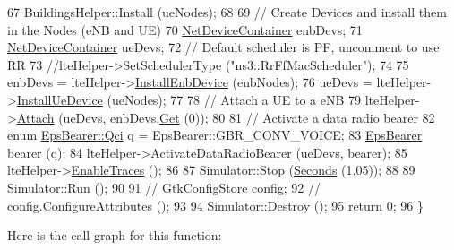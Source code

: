 \begin{DoxyCode}
67   BuildingsHelper::Install (ueNodes);
68 
69   \textcolor{comment}{// Create Devices and install them in the Nodes (eNB and UE)}
70   \hyperlink{classns3_1_1NetDeviceContainer}{NetDeviceContainer} enbDevs;
71   \hyperlink{classns3_1_1NetDeviceContainer}{NetDeviceContainer} ueDevs;
72   \textcolor{comment}{// Default scheduler is PF, uncomment to use RR}
73   \textcolor{comment}{//lteHelper->SetSchedulerType ("ns3::RrFfMacScheduler");}
74 
75   enbDevs = lteHelper->\hyperlink{classns3_1_1LteHelper_a5e009ad35ef85f46b5a6099263f15a03}{InstallEnbDevice} (enbNodes);
76   ueDevs = lteHelper->\hyperlink{classns3_1_1LteHelper_ac9cd932d7de92811cfa953c2e3b2fc9f}{InstallUeDevice} (ueNodes);
77 
78   \textcolor{comment}{// Attach a UE to a eNB}
79   lteHelper->\hyperlink{classns3_1_1LteHelper_a9466743f826aa2652a87907b7f0a1c87}{Attach} (ueDevs, enbDevs.\hyperlink{classns3_1_1NetDeviceContainer_a677d62594b5c9d2dea155cc5045f4d0b}{Get} (0));
80 
81   \textcolor{comment}{// Activate a data radio bearer}
82   \textcolor{keyword}{enum} \hyperlink{structns3_1_1EpsBearer_aecf0c67109c5eb4ec0b07226fff5885e}{EpsBearer::Qci} q = EpsBearer::GBR\_CONV\_VOICE;
83   \hyperlink{structns3_1_1EpsBearer}{EpsBearer} bearer (q);
84   lteHelper->\hyperlink{classns3_1_1LteHelper_ac896e16cf162e4beeaa292d39ab1b700}{ActivateDataRadioBearer} (ueDevs, bearer);
85   lteHelper->\hyperlink{classns3_1_1LteHelper_aeb70fd96f1c58806a5b7ad9f68a795e0}{EnableTraces} ();
86 
87   Simulator::Stop (\hyperlink{group__timecivil_ga33c34b816f8ff6628e33d5c8e9713b9e}{Seconds} (1.05));
88 
89   Simulator::Run ();
90 
91   \textcolor{comment}{// GtkConfigStore config;}
92   \textcolor{comment}{// config.ConfigureAttributes ();}
93 
94   Simulator::Destroy ();
95   \textcolor{keywordflow}{return} 0;
96 \}
\end{DoxyCode}


Here is the call graph for this function\+:


